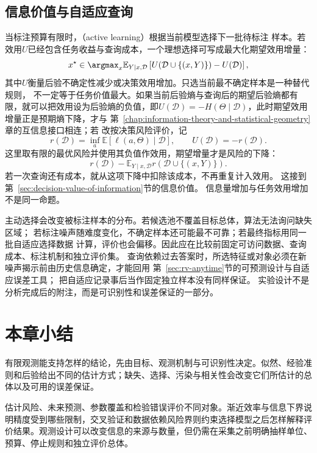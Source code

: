 \subsection{信息价值与自适应查询}
当标注预算有限时，（active learning）根据当前模型选择下一批待标注
样本。若效用\(U\)已经包含任务收益与查询成本，一个理想选择可写成最大化期望效用增量：
\[
  x^\star\in\argmax_x
  \mathbb{E}_{Y\mid x,\mathcal D}
  \left[
    U(\mathcal D\cup\{(x,Y)\})-U(\mathcal D)
  \right],
\]
其中\(U\)衡量后验不确定性减少或决策效用增加。只选当前最不确定样本是一种替代规则，
不一定等于任务价值最大。如果当前后验熵与查询后的期望后验熵都有限，就可以把效用设为后验熵的负值，即\(U(\mathcal D)=-H(\Theta\mid\mathcal D)\)，此时期望效用增量正是预期熵下降，才与
第~\ref{chap:information-theory-and-statistical-geometry}章的互信息接口相连；若
改按决策风险评价，记
\[
 r(\mathcal D)=\inf_a\mathbb E[\ell(a,\Theta)\mid\mathcal D],
 \qquad U(\mathcal D)=-r(\mathcal D).
\]
这里取有限的最优风险并使用其负值作效用，期望增量才是风险的下降：
\[
 r(\mathcal D)-
 \mathbb E_{Y\mid x,\mathcal D}r(\mathcal D\cup\{(x,Y)\}).
\]
若一次查询还有成本，就从这项下降中扣除该成本，不再重复计入效用。
这接到第~\ref{sec:decision-value-of-information}节的信息价值。
信息量增加与任务效用增加不是同一命题。

主动选择会改变被标注样本的分布。若候选池不覆盖目标总体，算法无法询问缺失区域；
若标注噪声随难度变化，不确定样本还可能最不可靠；若最终指标用同一批自适应选择数据
计算，评价也会偏移。因此应在比较前固定可访问数据、查询成本、标注机制和独立评价集。
查询依赖过去答案时，所选特征或对象必须在新噪声揭示前由历史信息确定，才能回用
第~\ref{sec:rv-anytime}节的可预测设计与自适应误差工具；
把自适应记录事后当作固定独立样本没有同样保证。
实验设计不是分析完成后的附注，而是可识别性和误差保证的一部分。

\section{本章小结}
\label{sec:statistics-summary}
有限观测能支持怎样的结论，先由目标、观测机制与可识别性决定。似然、经验准则和后验给出不同的估计方式；缺失、选择、污染与相关性会改变它们所估计的总体以及可用的误差保证。

估计风险、未来预测、参数覆盖和检验错误评价不同对象。渐近效率与信息下界说明精度受到哪些限制，交叉验证和数据依赖风险界则约束选择模型之后怎样解释评价结果。观测设计可以改变信息的来源与数量，但仍需在采集之前明确抽样单位、预算、停止规则和独立评价总体。
